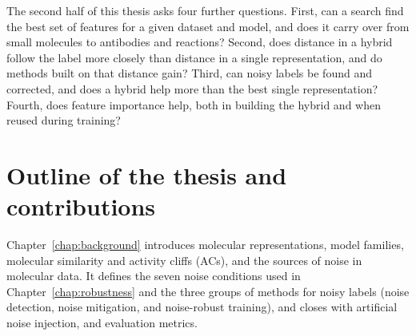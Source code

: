 The second half of this thesis asks four further questions. First, can a search find the best set of features for a given dataset and model, and does it carry over from small molecules to antibodies and reactions? Second, does distance in a hybrid follow the label more closely than distance in a single representation, and do methods built on that distance gain? Third, can noisy labels be found and corrected, and does a hybrid help more than the best single representation? Fourth, does feature importance help, both in building the hybrid and when reused during training?

\section{Outline of the thesis and contributions}

Chapter~\ref{chap:background} introduces molecular representations, model families, molecular similarity and activity cliffs (ACs), and the sources of noise in molecular data. It defines the seven noise conditions used in Chapter~\ref{chap:robustness} and the three groups of methods for noisy labels (noise detection, noise mitigation, and noise-robust training), and closes with artificial noise injection, and evaluation metrics.

